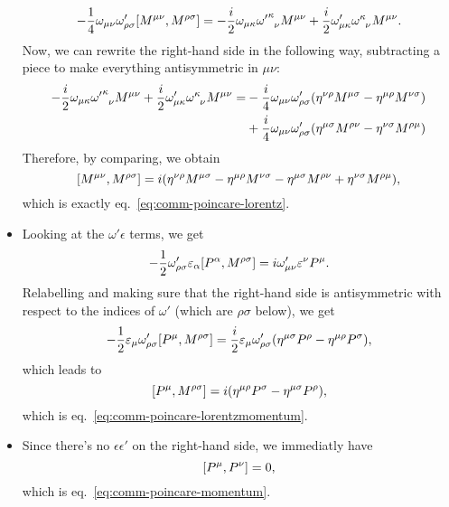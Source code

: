 \begin{mdframed}
\begin{innerproof}
\begin{itemize}
    \begin{align*}
       - \frac{1}{4} \omega_{\mu\nu} \omega'_{\rho\sigma} \comm{M^{\mu\nu}}{M^{\rho\sigma}} = -\frac{i}{2} \omega_{\mu\kappa} \tensor{{\omega'}}{^\kappa_\nu} M^{\mu\nu} + \frac{i}{2} \omega'_{\mu\kappa} \tensor{\omega}{^\kappa_\nu} M^{\mu\nu} .
    \end{align*}
    Now, we can rewrite the right-hand side in the following way, subtracting a piece to make everything antisymmetric in $\mu\nu$:
    \begin{align*}
        -\frac{i}{2} \omega_{\mu\kappa} \tensor{{\omega'}}{^\kappa_\nu} M^{\mu\nu} + \frac{i}{2} \omega'_{\mu\kappa} \tensor{\omega}{^\kappa_\nu} M^{\mu\nu} = &-\frac{i}{4} \omega_{\mu\nu} \omega'_{\rho\sigma}( \eta^{\nu\rho}M^{\mu\sigma} - \eta^{\mu\rho}M^{\nu\sigma} ) \\
        &+ \frac{i}{4} \omega_{\mu\nu}\omega'_{\rho\sigma} ( \eta^{\mu\sigma}M^{\rho\nu} -\eta^{\nu\sigma}M^{\rho\mu})
    \end{align*}
    Therefore, by comparing, we obtain
    \begin{equation*}
        \comm{M^{\mu\nu}}{M^{\rho\sigma}} = i ( \eta^{\nu\rho}M^{\mu\sigma} - \eta^{\mu\rho}M^{\nu\sigma} - \eta^{\mu\sigma}M^{\rho\nu} + \eta^{\nu\sigma}M^{\rho\mu}),
    \end{equation*}
    which is exactly eq.~\eqref{eq:comm-poincare-lorentz}.
    \item Looking at the $\omega' \epsilon$ terms, we get
    \begin{equation*}
         - \frac{1}{2} \omega'_{\rho\sigma} \epsilon_\alpha \comm{P^\alpha}{M^{\rho\sigma}} = i \omega'_{\mu\nu} \epsilon^\nu P^\mu .
    \end{equation*}
    Relabelling and making sure that the right-hand side is antisymmetric with respect to the indices of $\omega'$ (which are $\rho\sigma$ below), we get
    \begin{equation*}
        -\frac{1}{2} \epsilon_{\mu} \omega'_{\rho\sigma}\comm{P^\mu}{M^{\rho\sigma}} = \frac{i}{2} \epsilon_\mu \omega'_{\rho\sigma}  ( \eta^{\mu\sigma} P^\rho - \eta^{\mu\rho}P^{\sigma} ) ,
    \end{equation*}
    which leads to
    \begin{equation*}
        \comm{P^\mu}{M^{\rho\sigma}} = i (\eta^{\mu\rho} P^\sigma - \eta^{\mu\sigma} P^\rho),
    \end{equation*}
    which is eq.~\eqref{eq:comm-poincare-lorentzmomentum}.
    \item Since there's no $\epsilon \epsilon'$ on the right-hand side, we immediatly have
    \begin{equation*}
        \comm{P^\mu}{P^\nu} = 0,
    \end{equation*}
    which is eq.~\eqref{eq:comm-poincare-momentum}. \qedhere
\end{itemize}
\end{innerproof}
\end{mdframed}



